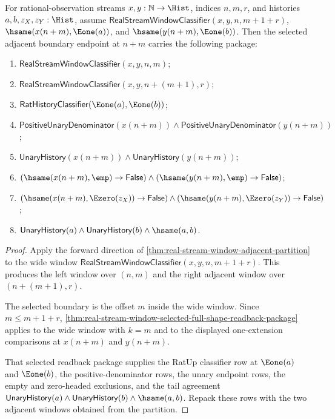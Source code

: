 \begin{theorem}
\label{thm:real-stream-window-adjacent-refinement-readback-package}
For rational-observation streams $x,y:\mathbb{N}\to\Hist$, indices $n,m,r$,
and histories $a,b,z_X,z_Y:\Hist$, assume
$\mathsf{RealStreamWindowClassifier}(x,y,n,m+1+r)$,
$\hsame(x(n+m),\Eone(a))$, and $\hsame(y(n+m),\Eone(b))$. Then the selected
adjacent boundary endpoint at $n+m$ carries the following package:
\begin{enumerate}
\item $\mathsf{RealStreamWindowClassifier}(x,y,n,m)$;
\item $\mathsf{RealStreamWindowClassifier}(x,y,n+(m+1),r)$;
\item $\mathsf{RatHistoryClassifier}(\Eone(a),\Eone(b))$;
\item $\mathsf{PositiveUnaryDenominator}(x(n+m))\land
\mathsf{PositiveUnaryDenominator}(y(n+m))$;
\item $\mathsf{UnaryHistory}(x(n+m))\land
\mathsf{UnaryHistory}(y(n+m))$;
\item $(\hsame(x(n+m),\emp)\to\mathsf{False})\land
(\hsame(y(n+m),\emp)\to\mathsf{False})$;
\item $(\hsame(x(n+m),\Ezero(z_X))\to\mathsf{False})\land
(\hsame(y(n+m),\Ezero(z_Y))\to\mathsf{False})$;
\item $\mathsf{UnaryHistory}(a)\land \mathsf{UnaryHistory}(b)\land
\hsame(a,b)$.
\end{enumerate}
\end{theorem}
\begin{proof}
Apply the forward direction of
\autoref{thm:real-stream-window-adjacent-partition} to the wide window
$\mathsf{RealStreamWindowClassifier}(x,y,n,m+1+r)$. This produces the left
window over $(n,m)$ and the right adjacent window over $(n+(m+1),r)$.

The selected boundary is the offset $m$ inside the wide window. Since
$m\le m+1+r$,
\autoref{thm:real-stream-window-selected-full-shape-readback-package} applies
to the wide window with $k=m$ and to the displayed one-extension comparisons
at $x(n+m)$ and $y(n+m)$.

That selected readback package supplies the RatUp classifier row at
$\Eone(a)$ and $\Eone(b)$, the positive-denominator rows, the unary endpoint
rows, the empty and zero-headed exclusions, and the tail agreement
$\mathsf{UnaryHistory}(a)\land \mathsf{UnaryHistory}(b)\land \hsame(a,b)$.
Repack these rows with the two adjacent windows obtained from the partition.
\end{proof}

